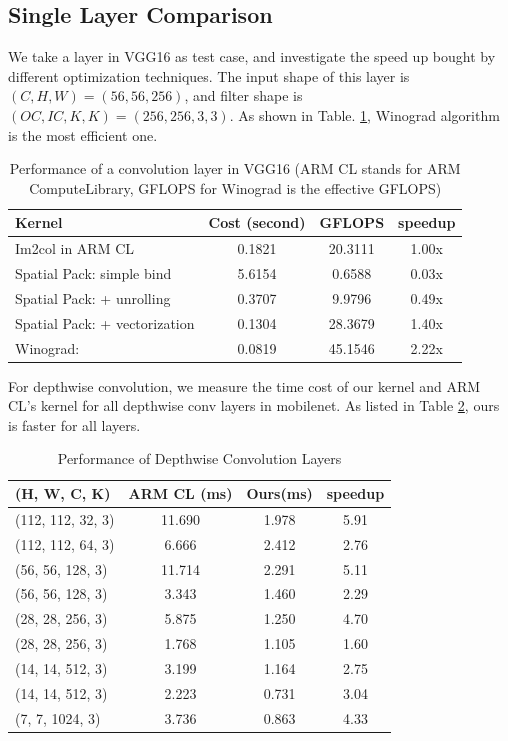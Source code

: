 \documentclass[sigplan]{acmart}
\begin{document}
\subsection {Single Layer Comparison}
We take a layer in VGG16 as test case, and investigate the speed up bought by different optimization techniques.
The input shape of this layer is $(C, H, W) = (56, 56, 256)$, and filter shape is $(OC, IC, K, K )= (256, 256, 3, 3)$. As shown in Table. \ref{table:conv2d}, Winograd algorithm is the most efficient one.
\begin{table}[htbp]
\centering
\begin{tabular}{lccc}
\hline
Kernel & Cost (second) & GFLOPS & speedup \\
\hline
Im2col in ARM CL	& 0.1821 & 20.3111 & 1.00x \\
Spatial Pack: simple bind		& 5.6154	& 0.6588	& 0.03x \\
Spatial Pack: + unrolling		& 0.3707	& 9.9796	& 0.49x \\ 
Spatial Pack: + vectorization		& 0.1304	& 28.3679 & 1.40x \\
Winograd: 		& 0.0819 & 45.1546 & 2.22x \\
\hline
\end{tabular}
\caption{Performance of a convolution layer in VGG16 (ARM CL stands for ARM ComputeLibrary, GFLOPS for Winograd is the effective GFLOPS)}
\label{table:conv2d}
\end{table}

For depthwise convolution, we measure the time cost of our kernel and ARM CL's kernel for all depthwise  conv layers in mobilenet. 
As listed in Table \ref{table:depth}, ours is faster for all layers.

\begin{table}[h]
\centering
\begin{tabular}{lccc}
\hline
(H, W, C, K) & ARM CL (ms) & Ours(ms) & speedup \\
\hline
(112, 112, 32,   3) & 11.690 & 1.978 & 5.91 \\
(112, 112, 64,   3) & 6.666  & 2.412 & 2.76 \\
(56,  56,  128,  3) & 11.714 & 2.291 & 5.11 \\
(56,  56,  128,  3) & 3.343  & 1.460 & 2.29 \\
(28,  28,  256,  3) & 5.875  & 1.250 & 4.70 \\
(28,  28,  256,  3) & 1.768  & 1.105 & 1.60 \\
(14,  14,  512,  3) & 3.199  & 1.164 & 2.75 \\
(14,  14,  512,  3) & 2.223  & 0.731 & 3.04 \\
(7,   7,   1024, 3) & 3.736  & 0.863 & 4.33 \\
\hline
\end{tabular}
\caption{Performance of Depthwise Convolution Layers}
\label{table:depth}
\end{table}
\end{document}
